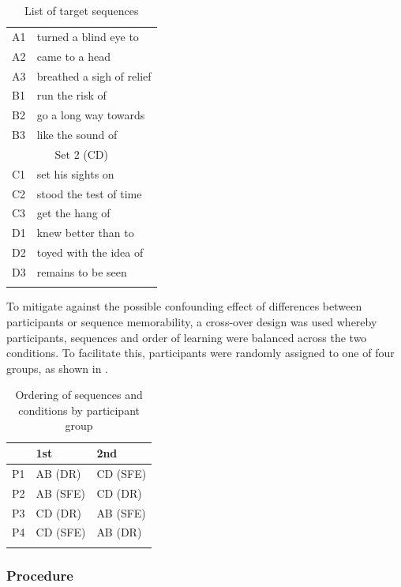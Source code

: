 \documentclass[output=paper]{langscibook}
\begin{document}
\begin{table}
\begin{tabular}{ll}
\lsptoprule
\multicolumn{2}{c}{Set 1 (AB)}\\\midrule
A1 & turned a blind eye to\\
A2 & came to a head\\
A3 & breathed a sigh of relief\\
B1 & run the risk of\\
B2 & go a long way towards\\
B3 & like the sound of\\\midrule
\multicolumn{2}{c}{Set 2 (CD)}\\\midrule
C1 & set his sights on\\
C2 & stood the test of time\\
C3 & get the hang of\\
D1 & knew better than to\\
D2 & toyed with the idea of\\
D3 & remains to be seen\\
\lspbottomrule
\end{tabular}
\caption{List of target sequences\label{tab:cutler:1}}
\end{table}


To mitigate against the possible confounding effect of differences between participants or sequence memorability, a cross-over design was used whereby participants, sequences and order of learning were balanced across the two conditions. To facilitate this, participants were randomly assigned to one of four groups, as shown in .


\begin{table}
\begin{tabular}{lll} 
\lsptoprule
  & 1st & 2nd\\\midrule
P1& AB (DR) & CD (SFE)\\
P2& AB (SFE) & CD (DR)\\
P3& CD (DR) & AB (SFE)\\
P4& CD (SFE) & AB (DR)\\
\lspbottomrule
\end{tabular}
\caption{Ordering of sequences and conditions by participant group\label{tab:cutler:2}}
\end{table}

\subsubsection{Procedure}
\end{document}
